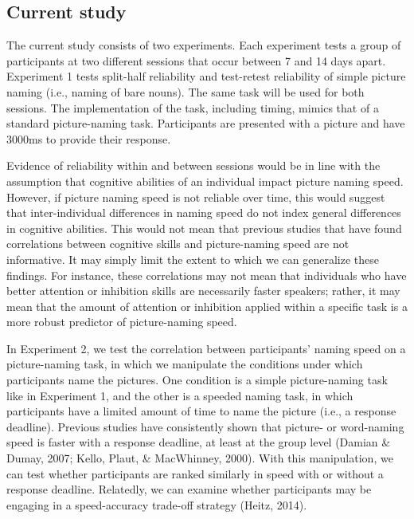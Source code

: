 \documentclass[
  man,floatsintext]{apa6}
\begin{document}
\hypertarget{current-study}{%
\subsection{Current study}\label{current-study}}

The current study consists of two experiments. Each experiment tests a group of participants at two different sessions that occur between 7 and 14 days apart. Experiment 1 tests split-half reliability and test-retest reliability of simple picture naming (i.e., naming of bare nouns). The same task will be used for both sessions. The implementation of the task, including timing, mimics that of a standard picture-naming task. Participants are presented with a picture and have 3000ms to provide their response.

Evidence of reliability within and between sessions would be in line with the assumption that cognitive abilities of an individual impact picture naming speed. However, if picture naming speed is not reliable over time, this would suggest that inter-individual differences in naming speed do not index general differences in cognitive abilities. This would not mean that previous studies that have found correlations between cognitive skills and picture-naming speed are not informative. It may simply limit the extent to which we can generalize these findings. For instance, these correlations may not mean that individuals who have better attention or inhibition skills are necessarily faster speakers; rather, it may mean that the amount of attention or inhibition applied within a specific task is a more robust predictor of picture-naming speed.

In Experiment 2, we test the correlation between participants' naming speed on a picture-naming task, in which we manipulate the conditions under which participants name the pictures. One condition is a simple picture-naming task like in Experiment 1, and the other is a speeded naming task, in which participants have a limited amount of time to name the picture (i.e., a response deadline). Previous studies have consistently shown that picture- or word-naming speed is faster with a response deadline, at least at the group level (Damian \& Dumay, 2007; Kello, Plaut, \& MacWhinney, 2000). With this manipulation, we can test whether participants are ranked similarly in speed with or without a response deadline. Relatedly, we can examine whether participants may be engaging in a speed-accuracy trade-off strategy (Heitz, 2014).
\end{document}
